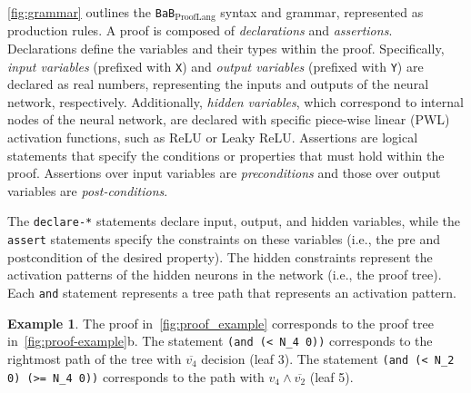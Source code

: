 \documentclass[oneside,11pt,dvipsnames]{book}
\numberwithin{equation}{section}
\theoremstyle{definition}
\newtheorem{example}{Example}[section]
\theoremstyle{remark}
\newcommand{\mycode}[1]{\textrm{\texttt{#1}}}
\newcommand{\prooflang}{\texttt{BaB$_{\text{ProofLang}}$}}
\begin{document}

\autoref{fig:grammar} outlines the \prooflang{} syntax and grammar, represented as production rules.
A proof is composed of \textit{declarations} and \textit{assertions}. Declarations define the variables and their types within the proof. Specifically, \textit{input variables} (prefixed with \mycode{X}) and \textit{output variables} (prefixed with \mycode{Y}) are declared as real numbers, representing the inputs and outputs of the neural network, respectively. Additionally, \textit{hidden variables}, which correspond to internal nodes of the neural network, are declared with specific piece-wise linear (PWL) activation functions, such as ReLU or Leaky ReLU.
Assertions are logical statements that specify the conditions or properties that must hold within the proof. Assertions over input variables are \emph{preconditions} and those over output variables are \emph{post-conditions}. %



The \texttt{declare-*} statements declare input, output, and hidden variables, while the \texttt{assert} statements specify the constraints on these variables (i.e., the pre and postcondition of the desired property).
The hidden constraints represent the activation patterns of the hidden neurons in the network (i.e., the proof tree). Each \texttt{and} statement represents a tree path that represents an activation pattern.

\begin{example}
    The proof in~\autoref{fig:proof_example} corresponds to the proof tree in~\autoref{fig:proof-example}b. The statement \texttt{(and (< N\_4 0))} corresponds to the rightmost path of the tree with $\overline{v_4}$ decision (leaf 3).  The statement \texttt{(and (< N\_2 0) (>= N\_4 0))} corresponds to the path with $v_4 \land \overline{v_2}$ (leaf 5).
\end{example}
\end{document}

